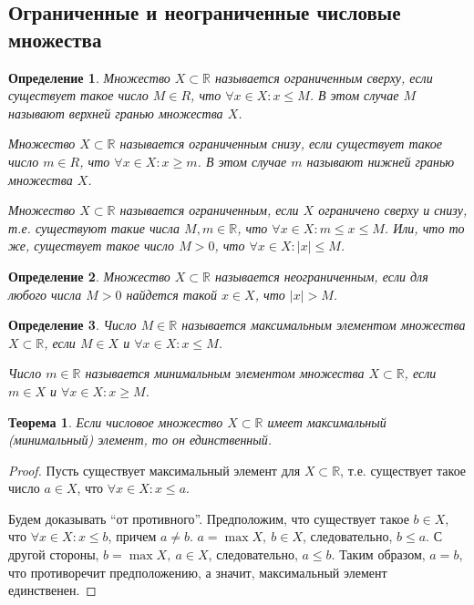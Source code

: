 \documentclass[a4paper,12pt]{article} %
\newtheorem{definition}{Определение}[section]
\newtheorem{theorem}{Теорема}[section]
\theoremstyle{remark}
\theoremstyle{definition}
\begin{document}
\subsection{Ограниченные и неограниченные числовые множества}
\begin{definition}
    Множество $X \subset \mathbb{R}$ называется ограниченным сверху, если существует такое число $M \in R$,
    что $\forall x\in X : x \le M$. В этом случае $M$ называют верхней гранью множества $X$.

    Множество $X \subset \mathbb{R}$ называется ограниченным снизу, если существует такое число $m \in R$,
    что $\forall x\in X : x\ge m$. В этом случае $m$ называют нижней гранью множества $X$.

    Множество $X\subset \mathbb{R}$ называется ограниченным, если $X$ ограничено сверху и снизу, т.е. существуют такие числа $M, m \in \mathbb{R}$, что $\forall x\in X : m\le x \le M$. Или, что то же, существует такое число $M>0$, что $\forall x\in X : |x|\le M$.
\end{definition}
\begin{definition}
    Множество $X\subset \mathbb{R}$ называется неограниченным, если для любого числа $M>0$ найдется такой $x\in X$, что $|x|>M$.
\end{definition}
\begin{definition}
    Число $M\in \mathbb{R}$ называется максимальным элементом множества $X\subset \mathbb{R}$, если $M\in X$ и 
    $\forall x\in X : x\le M$.

    Число $m\in \mathbb{R}$ называется минимальным элементом множества $X\subset \mathbb{R}$, если $m\in X$ и 
    $\forall x\in X : x\ge M$.
\end{definition}

\begin{theorem}
    Если числовое множество $X \subset \mathbb{R}$ имеет максимальный (минимальный) элемент, то он единственный.
\end{theorem}
\begin{proof}
    Пусть существует максимальный элемент для $X\subset \mathbb{R}$, т.е. существует такое число $a\in X$, что $\forall x \in X : x \le a$.
    
    Будем доказывать ``от противного''. Предположим, что существует такое $b\in X$, что $\forall x\in X : x\le b$, причем $a\neq b$. $a = \max X, \ b\in X$, следовательно, $b \le a$. С другой стороны, $b = \max X, \ a \in X$, следовательно, $a \le b$. Таким образом, $a=b$, что противоречит предположению, а значит, максимальный элемент единственен.
\end{proof}
\end{document}
